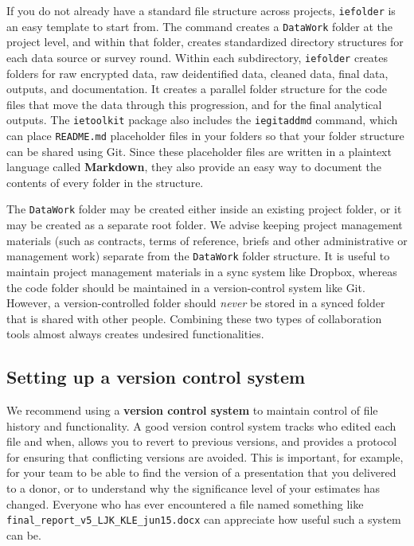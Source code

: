 If you do not already have a standard file structure across projects,
\texttt{iefolder} is an easy template to start from.
The command creates a \texttt{DataWork} folder at the project level,
and within that folder, creates standardized directory structures
for each data source or survey round.
Within each subdirectory, \texttt{iefolder} creates folders for raw encrypted data,
raw deidentified data, cleaned data, final data, outputs, and documentation.
It creates a parallel folder structure for the code files
that move the data through this progression,
and for the final analytical outputs.
The \texttt{ietoolkit} package also includes the \texttt{iegitaddmd} command,
which can place \texttt{README.md} placeholder files in your folders so that
your folder structure can be shared using Git.
Since these placeholder files are written in a plaintext language called \textbf{Markdown},
they also provide an easy way to document the contents of every folder in the structure.

The \texttt{DataWork} folder may be created either inside
an existing project folder, or it may be created as a separate root folder.
We advise keeping project management materials
(such as contracts, terms of reference, briefs and other administrative or management work)
separate from the \texttt{DataWork} folder structure.
It is useful to maintain project management materials in a sync system like Dropbox,
whereas the code folder should be maintained in a version-control system like Git.
However, a version-controlled folder should \textit{never}
be stored in a synced folder that is shared with other people.
Combining these two types of collaboration tools
almost always creates undesired functionalities.

\subsection{Setting up a version control system}
We recommend using a \textbf{version control system} to
maintain control of file history and functionality.
A good version control system tracks who edited each file and when,
allows you to revert to previous versions,
and provides a protocol for ensuring that conflicting versions are avoided.
This is important, for example, for your team
to be able to find the version of a presentation that you delivered to a donor,
or to understand why the significance level of your estimates has changed.
Everyone who has ever encountered a file named something like \texttt{final\_report\_v5\_LJK\_KLE\_jun15.docx}
can appreciate how useful such a system can be.

